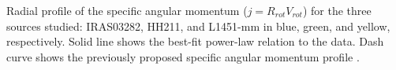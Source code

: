 \label{Fig:summary}
Radial profile of the specific angular momentum ($j=R_{rot} V_{rot}$) for the three sources studied: 
IRAS03282, HH211, and L1451-mm in blue, green, and yellow, respectively. 
Solid line shows the best-fit power-law relation to the data.
Dash curve shows the previously proposed specific angular momentum profile \citep{Belloche_2013}. 
